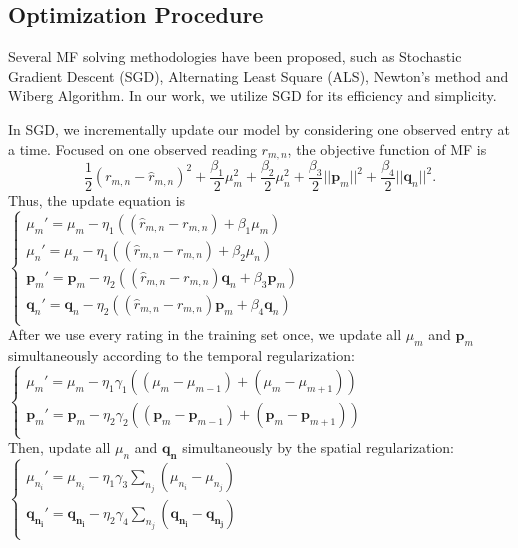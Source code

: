 \subsection{Optimization Procedure}
\label{optimation_procedure}
Several MF solving methodologies have been proposed, such as Stochastic Gradient Descent (SGD)\cite{koren2009matrix,chih2008large}, Alternating Least Square (ALS)\cite{koren2009matrix,zhou2008large}, Newton's method\cite{buchanan2005damped} and Wiberg Algorithm\cite{okatani2007wiberg}.
In our work, we utilize SGD for its efficiency and simplicity. 

In SGD, we incrementally update our model by considering one observed entry at a time.
Focused on one observed reading $r_{m,n}$, the objective function of MF is
\begin{equation*} \frac{1}{2}(r_{m,n} - \hat{r}_{m,n})^2 + \frac{\beta_1}{2}\mu_m^2 + \frac{\beta_2}{2}\mu_n^2 + \frac{\beta_3}{2}||\mathbf{p}_m||^2 + \frac{\beta_4}{2}||\mathbf{q}_n||^2.\end{equation*}
Thus, the update equation is\\
\indent	$\begin{cases}
	\mu_m' = \mu_m - \eta_1 ((\hat{r}_{m,n}-r_{m,n}) + \beta_1 \mu_m) \\
	\mu_n' = \mu_n - \eta_1 ((\hat{r}_{m,n}-r_{m,n}) + \beta_2 \mu_n) \\
	\mathbf{p}_{m}' = \mathbf{p}_{m} - \eta_2 ((\hat{r}_{m,n}-r_{m,n})\mathbf{q}_{n} + \beta_3 \mathbf{p}_{m})\\
	\mathbf{q}_{n}' = \mathbf{q}_{n} - \eta_2 ((\hat{r}_{m,n}-r_{m,n})\mathbf{p}_{m} + \beta_4 \mathbf{q}_{n})\\
	\end{cases}$\\
After we use every rating in the training set once, we update all $\mu_m$ and $\mathbf{p}_m$ simultaneously according to the temporal regularization:\\
\indent $\begin{cases}
	\mu_m' = \mu_m - \eta_1 \gamma_1((\mu_m-\mu_{m-1})+(\mu_m-\mu_{m+1}))\\
	\mathbf{p}_{m}' = \mathbf{p}_{m} - \eta_2 \gamma_2((\mathbf{p}_{m}-\mathbf{p}_{m-1})+(\mathbf{p}_{m}-\mathbf{p}_{m+1}))\\
	\end{cases}$\\
Then, update all $\mu_n$ and $\mathbf{q_n}$ simultaneously by the spatial regularization:\\
\indent $\begin{cases}
	\mu_{n_i}' = \mu_{n_i} - \eta_1 \gamma_3 \sum_{n_j}{(\mu_{n_i} - \mu_{n_j})}\\
	\mathbf{q_{n_i}}' = \mathbf{q_{n_i}} - \eta_2 \gamma_4 \sum_{n_j}{(\mathbf{q_{n_i}} - \mathbf{q_{n_j}})}\\
	\end{cases}$\\

